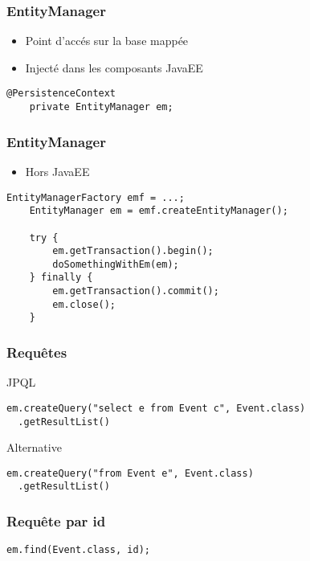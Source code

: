 \documentclass[t,12pt]{beamer}
\begin{document}
\begin{frame}[fragile]
	\frametitle{EntityManager}

	\begin{itemize}
		\item Point d'acc\'es sur la base mapp\'ee
		\item Inject\'e dans les composants JavaEE
	\end{itemize}

	\begin{lstlisting}[frame=none]
    @PersistenceContext
    private EntityManager em;
	\end{lstlisting}
\end{frame}

\begin{frame}[fragile]
	\frametitle{EntityManager}

	\begin{itemize}
		\item Hors JavaEE
	\end{itemize}

	\begin{lstlisting}[frame=none]
    EntityManagerFactory emf = ...;
    EntityManager em = emf.createEntityManager();

    try {
        em.getTransaction().begin();
        doSomethingWithEm(em);
    } finally {
        em.getTransaction().commit();
        em.close();
    }
	\end{lstlisting}
\end{frame}

\begin{frame}[fragile]
	\frametitle{Requ\^etes}

	\begin{block}{JPQL}
		\begin{lstlisting}[frame=none]
em.createQuery("select e from Event c", Event.class)
  .getResultList()
		\end{lstlisting}
	\end{block}

	\begin{exampleblock}{Alternative}
		\begin{lstlisting}[frame=none]
em.createQuery("from Event e", Event.class)
  .getResultList()
		\end{lstlisting}
	\end{exampleblock}
\end{frame}

\begin{frame}[fragile]
	\frametitle{Requ\^ete par id}

	\begin{lstlisting}[frame=none]
    em.find(Event.class, id);
	\end{lstlisting}
\end{frame}
\end{document}
